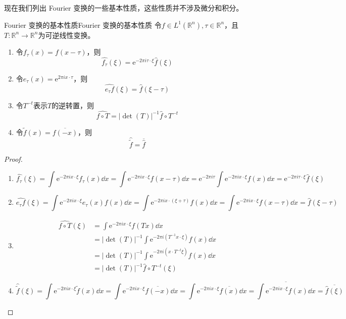 \documentclass[lang = cn, %
scheme = chinese          %
]
{elegantbook}             %
\newcommand{\R}{\mathbb{R}}            %
\newcommand{\ee}[1]{\mathrm{e}^{#1}}           %
\begin{document}
现在我们列出 Fourier 变换的一些基本性质，这些性质并不涉及微分和积分。

\begin{proposition}{Fourier 变换的基本性质}{Fourier 变换的基本性质}
	令$f\in L^1(\R^n),\tau\in\R^n$，且$T:\R^n\to\R^n$为可逆线性变换。
	\begin{enumerate}
		\item 令$f_{\tau}(x)=f(x-\tau)$，则
		\[
		\widehat{f_\tau}(\xi)
		=\ee{-2\pi i \tau \cdot \xi}\widehat{f}(\xi)
		\]
		\item 令$e_\tau(x)=\ee{2\pi i x\cdot \tau}$，则
		\[
		\widehat{e_\tau f}(\xi)=\widehat{f}(\xi-\tau)
		\]
		\item 令$T^{-t}$表示$T$的逆转置，则
		\[
		\widehat{f\circ T}=|\det(T)|^{-1}\widehat{f}\circ T^{-t}
		\]
		\item 令$\tilde{f}(x)=\overline{f(-x)}$，则
		\[
		\widehat{\tilde{f}}=\overline{\widehat{f}}
		\]
	\end{enumerate}
\end{proposition}

\begin{proof}
	\begin{enumerate}
		\item 
		\[
		\widehat{f_\tau}(\xi)
		=\int\ee{-2\pi i x \cdot \xi}f_\tau(x)\dd x
		=\int\ee{-2\pi i x \cdot \xi}f(x-\tau)\dd x
		=\ee{-2\pi i \tau}\int\ee{-2\pi i x \cdot \xi}f(x)\dd x
		=\ee{-2\pi i \tau \cdot \xi}\widehat{f}(\xi)
		\]
		\item 
		\[
		\widehat{e_\tau f}(\xi)
		=\int\ee{-2\pi i x \cdot \xi}e_\tau(x)f(x)\dd x
		=\int\ee{-2\pi i x \cdot (\xi+\tau)}f(x)\dd x
		=\int\ee{-2\pi i x \cdot \xi}f(x-\tau)\dd x
		=\widehat{f}(\xi-\tau)
		\]
		\item 
		\begin{align*}
			\widehat{f\circ T}(\xi)
			& = \int\ee{-2\pi i x \cdot \xi}f(Tx)\dd x \\
			& = |\det(T)|^{-1}\int\ee{-2\pi i (T^{-1}x \cdot \xi)}f(x)\dd x \\
			& = |\det(T)|^{-1}\int\ee{-2\pi i (x \cdot T^{-t}\xi)}f(x)\dd x \\
			& = |\det(T)|^{-1}\widehat{f}\circ T^{-t}(\xi)
		\end{align*}
		\item 
		\[
		\widehat{\tilde{f}}(\xi)
		= \int\ee{-2\pi i x \cdot \xi}\tilde{f}(x)\dd x
		= \int\ee{-2\pi i x \cdot \xi}\overline{f(-x)}\dd x 
		= \int\ee{-2\pi i x \cdot \xi}\overline{f(x)}\dd x 
		= \overline{\int\ee{-2\pi i x \cdot \xi}f(x)\dd x}
		= \overline{\widehat{f}(\xi)}
		\]
	\end{enumerate}
\end{proof}
\end{document}
